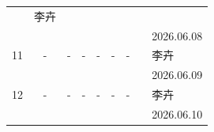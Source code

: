 \documentclass[UTF8,10pt,a4paper,fontset=fandol]{ctexart}
\newcommand{\fieldvalue}[1]{#1}
\newcommand{\handwritten}[1]{#1}
\begin{document}
\begin{center}
\begin{tabular}{|c|c|c|c|c|c|c|p{2.2cm}|p{2.8cm}|}
&
\fieldvalue{\handwritten{李卉}}\\[-1mm]
&
&
&
&
&
&
&
&
\fieldvalue{\handwritten{2026.06.08}}\\
\hline
\fieldvalue{\handwritten{11}} &
\fieldvalue{\handwritten{-}} &
\fieldvalue{\handwritten{-}} &
\fieldvalue{\handwritten{-}} &
\fieldvalue{\handwritten{-}} &
\fieldvalue{\handwritten{-}} &
\fieldvalue{\handwritten{-}} &
&
\fieldvalue{\handwritten{李卉}}\\[-1mm]
&
&
&
&
&
&
&
&
\fieldvalue{\handwritten{2026.06.09}}\\
\hline
\fieldvalue{\handwritten{12}} &
\fieldvalue{\handwritten{-}} &
\fieldvalue{\handwritten{-}} &
\fieldvalue{\handwritten{-}} &
\fieldvalue{\handwritten{-}} &
\fieldvalue{\handwritten{-}} &
\fieldvalue{\handwritten{-}} &
&
\fieldvalue{\handwritten{李卉}}\\[-1mm]
&
&
&
&
&
&
&
&
\fieldvalue{\handwritten{2026.06.10}}\\
\hline

\end{tabular}
\end{center}
\end{document}
